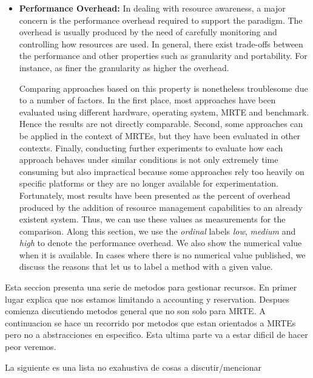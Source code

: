 \begin{itemize}
\item \textbf{Performance Overhead:} 
In dealing with resource awareness, a major concern is the performance overhead required to support the paradigm.
The overhead is usually produced by the need of carefully monitoring and controlling how resources are used.
In general, there exist trade-offs between the performance and other properties such as granularity and portability.
For instance, as finer the granularity as higher the overhead.

Comparing approaches based on this property is nonetheless troublesome due to a number of factors.
In the first place, most approaches have been evaluated using different hardware, operating system, MRTE and benchmark.
Hence the results are not directly comparable.  
Second, some approaches can be applied in the context of MRTEs, but they have been evaluated in other contexts.
Finally, conducting further experiments to evaluate how each approach behaves under similar conditions is not only extremely time consuming but also impractical because some approaches rely too heavily on specific platforms or they are no longer available for experimentation.
Fortunately, most results have been presented as the percent of overhead produced by the addition of resource management capabilities to an already existent system.
Thus, we can use these values as measurements for the comparison.
Along this section, we use the \textit{ordinal} labels \textit{low}, \textit{medium} and \textit{high} to denote the performance overhead.
We also show the numerical value when it is available.
In cases where there is no numerical value published, we discuss the reasons that let us to label a method with a given value.
\end{itemize}

Esta seccion presenta una serie de metodos para gestionar recursos. En primer lugar explica que nos estamos limitando a accounting y reservation. Despues comienza discutiendo metodos general que no son solo para MRTE. A continuacion se hace un recorrido por metodos que estan orientados a MRTEs pero no a abstracciones en especifico. Esta ultima parte va a estar dificil de hacer peor veremos. 

La siguiente es una lista no exahustiva de cosas a discutir/mencionar

